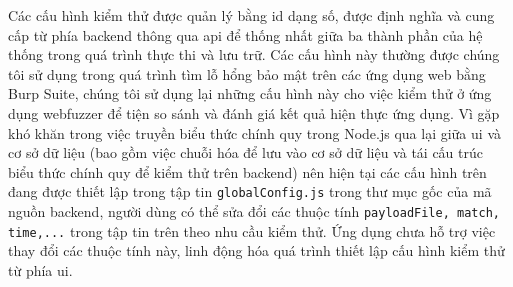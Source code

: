 Các cấu hình kiểm thử được quản lý bằng id dạng số, được định nghĩa và cung cấp từ phía backend thông qua \acrshort{api} để thống nhất giữa ba thành phần của hệ thống trong quá trình thực thi và lưu trữ. Các cấu hình này thường được chúng tôi sử dụng trong quá trình tìm lỗ hổng bảo mật trên các ứng dụng web bằng Burp Suite, chúng tôi sử dụng lại những cấu hình này cho việc kiểm thử ở ứng dụng webfuzzer để tiện so sánh và đánh giá kết quả hiện thực ứng dụng. Vì gặp khó khăn trong việc truyền biểu thức chính quy trong Node.js qua lại giữa \acrshort{ui} và cơ sở dữ liệu (bao gồm việc chuỗi hóa để lưu vào cơ sở dữ liệu và tái cấu trúc biểu thức chính quy để kiểm thử trên backend) nên hiện tại các cấu hình trên đang được thiết lập trong tập tin \texttt{globalConfig.js} trong thư mục gốc của mã nguồn backend, người dùng có thể sửa đổi các thuộc tính \texttt{payloadFile, match, time,...} trong tập tin trên theo nhu cầu kiểm thử. Ứng dụng chưa hỗ trợ việc thay đổi các thuộc tính này, linh động hóa quá trình thiết lập cấu hình kiểm thử từ phía \acrshort{ui}.\par
